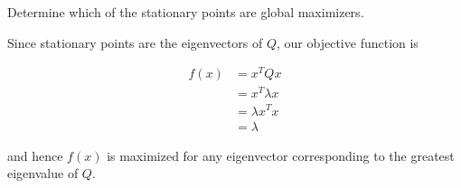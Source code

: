 Determine which of the stationary points are global maximizers.

\begin{solution}
    Since stationary points are the eigenvectors of $Q$, our objective function is

    \begin{align*}
        f(x) &= x^T Q x \\
             &= x^T \lambda x \\
             &= \lambda x^T x \\
             &= \lambda
    \end{align*}

    and hence $f(x)$ is maximized for any eigenvector corresponding to the greatest eigenvalue of $Q$.
    \ \\
\end{solution}